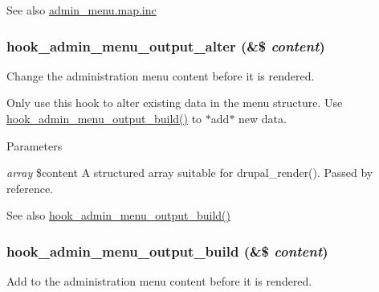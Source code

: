 \begin{DoxySeeAlso}{See also}
\hyperlink{admin__menu_8map_8inc}{admin\_\-menu.map.inc} 
\end{DoxySeeAlso}
\hypertarget{admin__menu_8api_8php_a7502be228e9b3e1a04cbc17fa0e42b25}{
\subsubsection[{hook\_\-admin\_\-menu\_\-output\_\-alter}]{\setlength{\rightskip}{0pt plus 5cm}hook\_\-admin\_\-menu\_\-output\_\-alter (\&\$ {\em content})}}
\label{admin__menu_8api_8php_a7502be228e9b3e1a04cbc17fa0e42b25}
Change the administration menu content before it is rendered.

Only use this hook to alter existing data in the menu structure. Use \hyperlink{admin__menu_8api_8php_a12517a63549c0d184148d7b5ed9907f4}{hook\_\-admin\_\-menu\_\-output\_\-build()} to $\ast$add$\ast$ new data.


\begin{DoxyParams}{Parameters}
\item[{\em array}]\$content A structured array suitable for drupal\_\-render(). Passed by reference.\end{DoxyParams}
\begin{DoxySeeAlso}{See also}
\hyperlink{admin__menu_8api_8php_a12517a63549c0d184148d7b5ed9907f4}{hook\_\-admin\_\-menu\_\-output\_\-build()} 
\end{DoxySeeAlso}
\hypertarget{admin__menu_8api_8php_a12517a63549c0d184148d7b5ed9907f4}{
\subsubsection[{hook\_\-admin\_\-menu\_\-output\_\-build}]{\setlength{\rightskip}{0pt plus 5cm}hook\_\-admin\_\-menu\_\-output\_\-build (\&\$ {\em content})}}
\label{admin__menu_8api_8php_a12517a63549c0d184148d7b5ed9907f4}
Add to the administration menu content before it is rendered.

